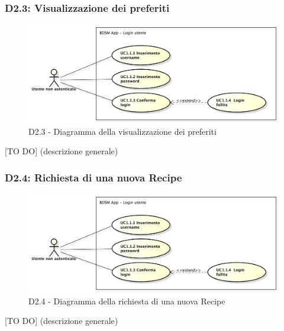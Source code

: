 		\subsubsection{D2.3: Visualizzazione dei preferiti} %
		\label{ssub:visualizzazione_dei_preferiti}
		\begin{figure}[!htbp]
			\centering
			\centerline{\includegraphics[scale=0.45]{./images/UC1_1.pdf}}
			\caption{D2.3 - Diagramma della visualizzazione dei preferiti}
		\end{figure}
		[TO DO] (descrizione generale)

		\subsubsection{D2.4: Richiesta di una nuova Recipe} %
		\label{ssub:richiesta_di_una_nuova_recipe}
		\begin{figure}[!htbp]
			\centering
			\centerline{\includegraphics[scale=0.45]{./images/UC1_1.pdf}}
			\caption{D2.4 - Diagramma della richiesta di una nuova Recipe}
		\end{figure}
		[TO DO] (descrizione generale)

